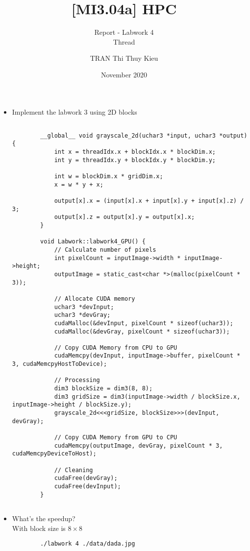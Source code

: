 \documentclass[10pt, a4paper]{article}
\title{[MI3.04a] HPC}
\subtitle{Report - Labwork 4 \\ Thread}
\author{TRAN Thi Thuy Kieu}
\date{November 2020}
\begin{document}
\maketitle



\begin{itemize}
    \item Implement the labwork 3 using 2D blocks
    \begin{verbatim}
        
        __global__ void grayscale_2d(uchar3 *input, uchar3 *output) {
            int x = threadIdx.x + blockIdx.x * blockDim.x;
            int y = threadIdx.y + blockIdx.y * blockDim.y;
        
            int w = blockDim.x * gridDim.x;
            x = w * y + x;
        
            output[x].x = (input[x].x + input[x].y + input[x].z) / 3; 
            output[x].z = output[x].y = output[x].x;
        }
        
        void Labwork::labwork4_GPU() {
            // Calculate number of pixels
            int pixelCount = inputImage->width * inputImage->height;
            outputImage = static_cast<char *>(malloc(pixelCount * 3));
        
            // Allocate CUDA memory  
            uchar3 *devInput;
            uchar3 *devGray;
            cudaMalloc(&devInput, pixelCount * sizeof(uchar3));
            cudaMalloc(&devGray, pixelCount * sizeof(uchar3));  
        
            // Copy CUDA Memory from CPU to GPU
            cudaMemcpy(devInput, inputImage->buffer, pixelCount * 3, cudaMemcpyHostToDevice);
        
            // Processing
            dim3 blockSize = dim3(8, 8);
            dim3 gridSize = dim3(inputImage->width / blockSize.x, inputImage->height / blockSize.y);
            grayscale_2d<<<gridSize, blockSize>>>(devInput, devGray);
        
            // Copy CUDA Memory from GPU to CPU
            cudaMemcpy(outputImage, devGray, pixelCount * 3, cudaMemcpyDeviceToHost);
        
            // Cleaning
            cudaFree(devGray);
            cudaFree(devInput);
        }
        
    \end{verbatim}
    
    
    \item What’s the speedup? \\
    With block size is $8\times8$
    \begin{verbatim} 
        ./labwork 4 ./data/dada.jpg
        

\end{verbatim}
\end{itemize}
\end{document}
